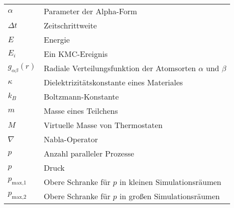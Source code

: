 \begin{longtable}{ll}
$\alpha$             & Parameter der Alpha-Form                                            \\
$\Delta t$           & Zeitschrittweite                                                    \\
$E$                  & Energie                                                             \\
$E_i$                & Ein KMC-Ereignis                                                    \\
$g_{\alpha\beta}(r)$ & Radiale Verteilungsfunktion der Atomsorten $\alpha$ und $\beta$     \\
$\kappa$             & Dielektrizitätskonstante eines Materiales                           \\
$k_B$                & Boltzmann-Konstante                                                 \\
$m$                  & Masse eines Teilchens                                               \\
$M$                  & Virtuelle Masse von Thermostaten                                    \\
$\nabla$             & Nabla-Operator                                                      \\
$p$                  & Anzahl paralleler Prozesse                                          \\
$p$                  & Druck                                                               \\
$p_\text{max,1}$     & Obere Schranke für $p$ in kleinen Simulationsräumen                 \\
$p_\text{max,2}$     & Obere Schranke für $p$ in großen Simulationsräumen                  \\

\end{longtable}
